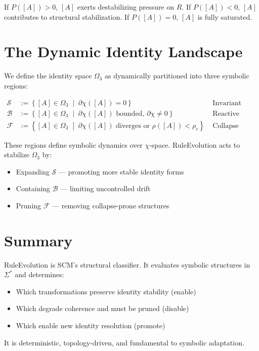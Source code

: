 If $P([A]) > 0$, $[A]$ exerts destabilizing pressure on $R$.  
If $P([A]) < 0$, $[A]$ contributes to structural stabilization.  
If $P([A]) = 0$, $[A]$ is fully saturated.

\section{The Dynamic Identity Landscape} \label{the-dynamic-identity-landscape}

We define the identity space $\Omega_3$ as dynamically partitioned into three symbolic regions:

\begin{align*}
\mathcal{S} &:= \left\{ [A] \in \Omega_3 \;\middle|\; \partial \chi([A]) = 0 \right\} && \text{Invariant Surface} \\
\mathcal{B} &:= \left\{ [A] \in \Omega_3 \;\middle|\; \partial \chi([A]) \text{ bounded, } \partial \chi \ne 0 \right\} && \text{Reactive Basin} \\
\mathcal{F} &:= \left\{ [A] \in \Omega_3 \;\middle|\; \partial \chi([A]) \text{ diverges or } \rho([A]) < \rho_c \right\} && \text{Collapse Fringe}
\end{align*}

These regions define symbolic dynamics over $\chi$-space.  
RuleEvolution acts to stabilize $\Omega_3$ by:

\begin{itemize}
  \item Expanding $\mathcal{S}$ — promoting more stable identity forms
  \item Containing $\mathcal{B}$ — limiting uncontrolled drift
  \item Pruning $\mathcal{F}$ — removing collapse-prone structures
\end{itemize}

\section{Summary}

RuleEvolution is SCM's structural classifier.  
It evaluates symbolic structures in $\Sigma^*$ and determines:

\begin{itemize}
  \item Which transformations preserve identity stability (enable)
  \item Which degrade coherence and must be pruned (disable)
  \item Which enable new identity resolution (promote)
\end{itemize}

It is deterministic, topology-driven, and fundamental to symbolic adaptation.
